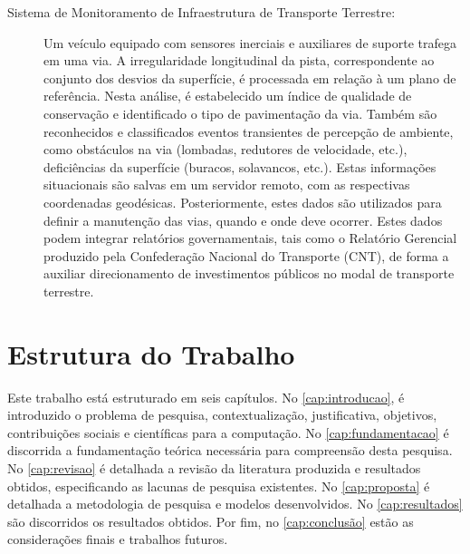 \begin{description}
\item [Sistema de Monitoramento de Infraestrutura de Transporte Terrestre:] Um veículo equipado com sensores inerciais e auxiliares de suporte trafega em uma via. A irregularidade longitudinal da pista, correspondente ao conjunto dos desvios da superfície, é processada em relação à um plano de referência. Nesta análise, é estabelecido um índice de qualidade de conservação e identificado o tipo de pavimentação da via. Também são reconhecidos e classificados eventos transientes de percepção de ambiente, como obstáculos na via (lombadas, redutores de velocidade, etc.), deficiências da superfície (buracos, solavancos, etc.). Estas informações situacionais são salvas em um servidor remoto, com as respectivas coordenadas geodésicas. Posteriormente, estes dados são utilizados para definir a manutenção das vias, quando e onde deve ocorrer. Estes dados podem integrar relatórios governamentais, tais como o Relatório Gerencial produzido pela Confederação Nacional do Transporte (CNT), de forma a auxiliar direcionamento de investimentos públicos no modal de transporte terrestre.

\end{description}

\section{Estrutura do Trabalho}

Este trabalho está estruturado em seis capítulos. No \autoref{cap:introducao}, é introduzido o problema de pesquisa, contextualização, justificativa, objetivos, contribuições sociais e científicas para a computação. No \autoref{cap:fundamentacao} é discorrida a fundamentação teórica necessária para compreensão desta pesquisa. No \autoref{cap:revisao} é detalhada a revisão da literatura produzida e resultados obtidos, especificando as lacunas de pesquisa existentes. No \autoref{cap:proposta} é detalhada a metodologia de pesquisa e modelos desenvolvidos. No \autoref{cap:resultados} são discorridos os resultados obtidos. Por fim, no \autoref{cap:conclusão} estão as considerações finais e trabalhos futuros.

